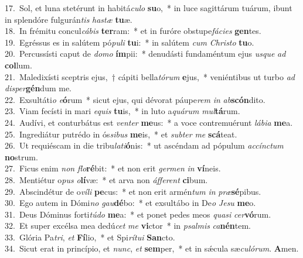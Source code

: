 {17.~}Sol, et luna stetérunt in habitá\textit{cu}\textit{lo} \textbf{su}o,~* in luce sagittárum tuárum, ibunt in splendóre fulgurán\textit{tis} \textit{ha}\textit{stæ} \textbf{tu}æ.\\
{18.~}In frémitu concul\textit{cá}\textit{bis} \textbf{ter}ram:~* et in furóre obstupe\textit{fá}\textit{ci}\textit{es} \textbf{gen}tes.\\
{19.~}Egréssus es in salútem pó\textit{pu}\textit{li} \textbf{tu}i:~* in salútem \textit{cum} \textit{Chri}\textit{sto} \textbf{tu}o.\\
{20.~}Percussísti caput de \textit{do}\textit{mo} \textbf{ím}pii:~* denudásti fundaméntum ejus \textit{us}\textit{que} \textit{ad} \textbf{col}lum.\\
{21.~}Maledixísti sceptris ejus,~† cápiti bella\textit{tó}\textit{rum} \textbf{e}jus,~* veniéntibus ut turbo \textit{ad} \textit{di}\textit{sper}\textbf{gén}dum me.\\
{22.~}Exsultáti\textit{o} \textit{e}\textbf{ó}rum~* sicut ejus, qui dévorat páupe\textit{rem} \textit{in} \textit{ab}\textbf{scón}dito.\\
{23.~}Viam fecísti in mari \textit{e}\textit{quis} \textbf{tu}is,~* in luto a\textit{quá}\textit{rum} \textit{mul}\textbf{tá}rum.\\
{24.~}Audívi, et conturbátus est \textit{ven}\textit{ter} \textbf{me}us:~* a voce contremuérunt \textit{lá}\textit{bi}\textit{a} \textbf{me}a.\\
{25.~}Ingrediátur putrédo in ós\textit{si}\textit{bus} \textbf{me}is,~* et \textit{sub}\textit{ter} \textit{me} \textbf{scá}teat.\\
{26.~}Ut requiéscam in die tribu\textit{la}\textit{ti}\textbf{ó}nis:~* ut ascéndam ad pópulum \textit{ac}\textit{cín}\textit{ctum} \textbf{no}strum.\\
{27.~}Ficus enim \textit{non} \textit{flo}\textbf{ré}bit:~* et non erit \textit{ger}\textit{men} \textit{in} \textbf{ví}neis.\\
{28.~}Mentiétur o\textit{pus} \textit{o}\textbf{lí}væ:~* et arva non \textit{áf}\textit{fe}\textit{rent} \textbf{ci}bum.\\
{29.~}Abscindétur de o\textit{ví}\textit{li} \textbf{pe}cus:~* et non erit armén\textit{tum} \textit{in} \textit{præ}\textbf{sé}pibus.\\
{30.~}Ego autem in Dómi\textit{no} \textit{gau}\textbf{dé}bo:~* et exsultábo in De\textit{o} \textit{Je}\textit{su} \textbf{me}o.\\
{31.~}Deus Dóminus forti\textit{tú}\textit{do} \textbf{me}a:~* et ponet pedes meos \textit{qua}\textit{si} \textit{cer}\textbf{vó}rum.\\
{32.~}Et super excélsa mea dedú\textit{cet} \textit{me} \textbf{vi}ctor~* in \textit{psal}\textit{mis} \textit{ca}\textbf{nén}tem.\\
{33.~}Glória Pa\textit{tri}, \textit{et} \textbf{Fí}lio,~* et Spi\textit{rí}\textit{tu}\textit{i} \textbf{San}cto.\\
{34.~}Sicut erat in princípio, et \textit{nunc}, \textit{et} \textbf{sem}per,~* et in sǽcula sæ\textit{cu}\textit{ló}\textit{rum}. \textbf{A}men.\\
